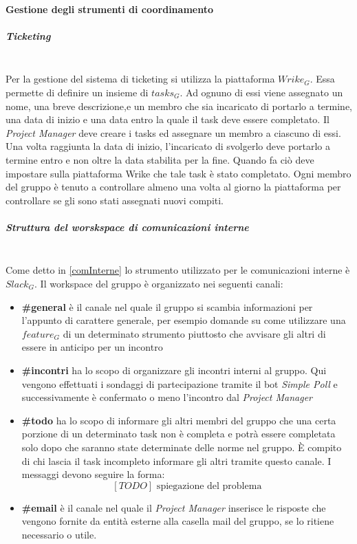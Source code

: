 		\paragraph{Gestione degli strumenti di coordinamento}
			\subparagraph{Ticketing} \mbox{} \\
			Per la gestione del sistema di ticketing si utilizza la piattaforma $Wrike_G$. Essa permette di definire un insieme di $tasks_G$. Ad ognuno di essi viene assegnato un nome, una breve descrizione,e un membro che sia incaricato di portarlo a termine, una data di inizio e una data entro la quale il task deve essere completato. Il \emph{Project Manager} deve creare i tasks ed assegnare un membro a ciascuno di essi. Una volta raggiunta la data di inizio, l'incaricato di svolgerlo deve portarlo a termine entro e non oltre la data stabilita per la fine. Quando fa ciò deve impostare sulla piattaforma Wrike che tale task è stato completato. Ogni membro del gruppo è tenuto a controllare almeno una volta al giorno la piattaforma per controllare se gli sono stati assegnati nuovi compiti.
			
			\subparagraph{Struttura del worskspace di comunicazioni interne} \mbox{} \\
			Come detto in \ref{comInterne} lo strumento utilizzato per le comunicazioni interne è $Slack_G$. Il workspace del gruppo è organizzato nei seguenti canali:
			\begin{itemize}
				\item \textbf{\#general} è il canale nel quale il gruppo si scambia informazioni per l'appunto di carattere generale, per esempio domande su come utilizzare una $feature_G$ di un determinato strumento piuttosto che avvisare gli altri di essere in anticipo per un incontro
				\item \textbf{\#incontri} ha lo scopo di organizzare gli incontri interni al gruppo. Qui vengono effettuati i sondaggi di partecipazione tramite il bot \emph{Simple Poll} e successivamente è confermato o meno l'incontro dal \emph{Project Manager}
				\item \textbf{\#todo} ha lo scopo di informare gli altri membri del gruppo che una certa porzione di un determinato task non è completa e potrà essere completata solo dopo che saranno state determinate delle norme nel gruppo. È compito di chi lascia il task incompleto informare gli altri tramite questo canale. I messaggi devono seguire la forma:
						$$[TODO]\text{ spiegazione del problema}$$
				\item \textbf{\#email} è il canale nel quale il \emph{Project Manager} inserisce le risposte che vengono fornite da entità esterne alla casella mail del gruppo, se lo ritiene necessario o utile.
			\end{itemize}
			
